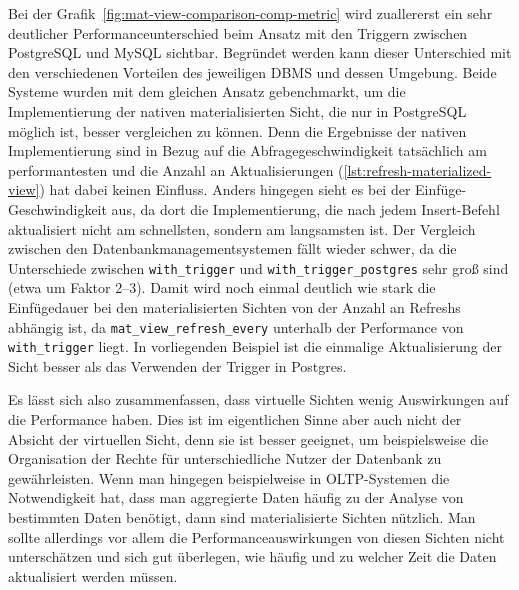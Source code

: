 Bei der Grafik~\ref{fig:mat-view-comparison-comp-metric} wird zuallererst ein sehr deutlicher Performanceunterschied beim Ansatz mit den Triggern zwischen PostgreSQL und MySQL sichtbar.
Begründet werden kann dieser Unterschied mit den verschiedenen Vorteilen des jeweiligen DBMS und dessen Umgebung.
Beide Systeme wurden mit dem gleichen Ansatz gebenchmarkt, um die Implementierung der nativen materialisierten Sicht, die nur in PostgreSQL möglich ist, besser vergleichen zu können.
Denn die Ergebnisse der nativen Implementierung sind in Bezug auf die Abfragegeschwindigkeit tatsächlich am performantesten und die Anzahl an Aktualisierungen (\ref{lst:refresh-materialized-view}) hat dabei keinen Einfluss.
Anders hingegen sieht es bei der Einfüge-Geschwindigkeit aus, da dort die Implementierung, die nach jedem Insert-Befehl aktualisiert nicht am schnellsten, sondern am langsamsten ist.
Der Vergleich zwischen den Datenbankmanagementsystemen fällt wieder schwer, da die Unterschiede zwischen \texttt{with\_trigger} und \texttt{with\_trigger\_postgres} sehr groß sind (etwa um Faktor 2--3).
Damit wird noch einmal deutlich wie stark die Einfügedauer bei den materialisierten Sichten von der Anzahl an Refreshs abhängig ist, da \texttt{mat\_view\_refresh\_every} unterhalb der Performance von \texttt{with\_trigger} liegt.
In vorliegenden Beispiel ist die einmalige Aktualisierung der Sicht besser als das Verwenden der Trigger in Postgres.

Es lässt sich also zusammenfassen, dass virtuelle Sichten wenig Auswirkungen auf die Performance haben.
Dies ist im eigentlichen Sinne aber auch nicht der Absicht der virtuellen Sicht, denn sie ist besser geeignet, um beispielsweise die Organisation der Rechte für unterschiedliche Nutzer der Datenbank zu gewährleisten.
Wenn man hingegen beispielweise in OLTP-Systemen die Notwendigkeit hat, dass man aggregierte Daten häufig zu der Analyse von bestimmten Daten benötigt, dann sind materialisierte Sichten nützlich.
Man sollte allerdings vor allem die Performanceauswirkungen von diesen Sichten nicht unterschätzen und sich gut überlegen, wie häufig und zu welcher Zeit die Daten aktualisiert werden müssen.